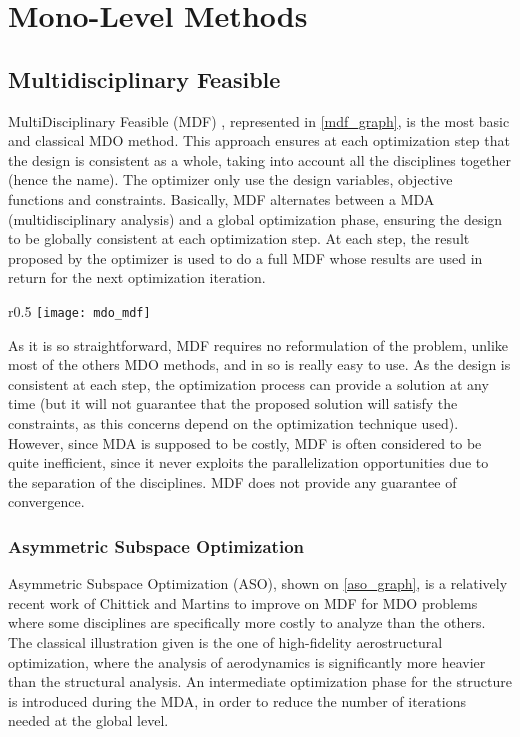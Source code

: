 \section{Mono-Level Methods}

\subsection{Multidisciplinary Feasible}

MultiDisciplinary Feasible (MDF) \cite{cramer1994problem}, represented in \figurename{} \ref{mdf_graph}, is the most basic and classical MDO method. This approach ensures at each optimization step that the design is consistent as a whole, taking into account all the disciplines together (hence the name). The optimizer only use the design variables, objective functions and constraints.
Basically, MDF alternates between a MDA (multidisciplinary analysis) and a global optimization phase, ensuring the design to be globally consistent at each optimization step. At each step, the result proposed by the optimizer is used to do a full MDF whose results are used in return for the next optimization iteration.

\begin{wrapfigure}{r}{0.5\textwidth}
\centering
\texttt{[image: mdo\_mdf]}
\caption{MDF method}\label{mdf_graph}
\end{wrapfigure}

As it is so straightforward, MDF requires no reformulation of the problem, unlike most of the others MDO methods, and in so is really easy to use. As the design is consistent at each step, the optimization process can provide a solution at any time (but it will not guarantee that the proposed solution will satisfy the constraints, as this concerns depend on the optimization technique used). However, since MDA is supposed to be costly, MDF is often considered to be quite inefficient, since it never exploits the parallelization opportunities due to the separation of the disciplines. MDF does not provide any guarantee of convergence.

\subsubsection{Asymmetric Subspace Optimization}

Asymmetric Subspace Optimization (ASO), shown on \figurename{} \ref{aso_graph}, is a relatively recent work of Chittick and Martins \cite{Chittick:2007:B} to improve on MDF for MDO problems where some disciplines are specifically more costly to analyze than the others. The classical illustration given is the one of high-fidelity aerostructural optimization, where the analysis of aerodynamics is significantly more heavier than the structural analysis. An intermediate optimization phase for the structure is introduced during the MDA, in order to reduce the number of iterations needed at the global level.

